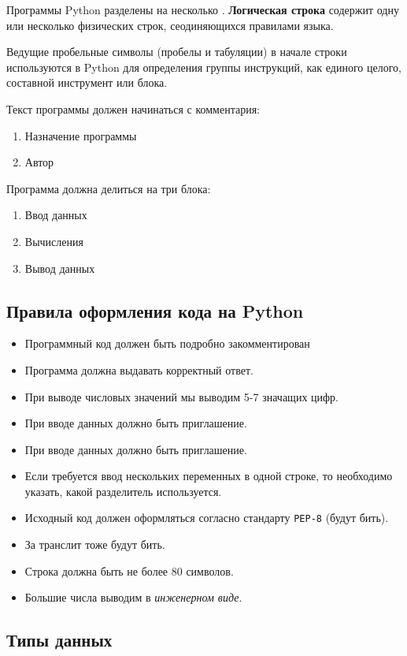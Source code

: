 Программы Python разделены на несколько . \textbf{Логическая строка} содержит одну или несколько физических строк, сеодиняющихся правилами языка.

  Ведущие пробельные символы (пробелы и табуляции) в начале строки используются в Python для определения группы инструкций, как единого целого, составной инструмент или блока.

Текст программы должен начинаться с комментария:
\begin{enumerate}
  \item Назначение программы
  \item Автор
\end{enumerate}

Программа должна делиться на три блока:
\begin{enumerate}
  \item Ввод данных
  \item Вычисления
  \item Вывод данных
\end{enumerate}

\subsection{Правила оформления кода на Python}

\begin{itemize}
  \item Программный код должен быть подробно закомментирован
  \item Программа должна выдавать корректный ответ.
  \item При выводе числовых значений мы выводим 5-7 значащих цифр.
  \item При вводе данных должно быть приглашение.
  \item При вводе данных должно быть приглашение.
  \item Если требуется ввод нескольких переменных в одной строке, то необходимо указать, какой разделитель используется.
  \item Исходный код должен оформляться согласно стандарту \texttt{PEP-8} (будут бить).
  \item За транслит тоже будут бить.
  \item Строка должна быть не более 80 символов.
  \item Большие числа выводим в \textit{инженерном виде}. 
\end{itemize}

\subsection{Типы данных}

